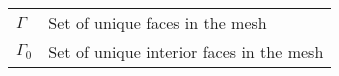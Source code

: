\documentclass[../doc.tex]{subfiles}
\begin{document}
\begin{longtable}{p{2cm}p{9cm}}
$\Gamma$ & Set of unique faces in the mesh \\
$\Gamma_0$ & Set of unique interior faces in the mesh 
\end{longtable}
\end{document}
